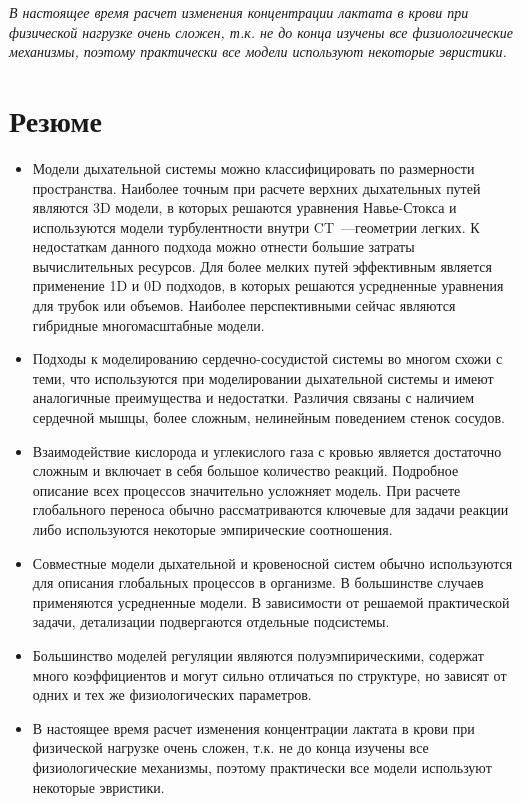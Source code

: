 \textit{В настоящее время расчет изменения концентрации лактата в крови при физической нагрузке очень сложен, т.к. не до конца изучены все физиологические механизмы, поэтому практически все модели используют некоторые эвристики.}

\section{Резюме}
\begin{itemize}
\item
Модели дыхательной системы можно классифицировать по размерности пространства. Наиболее точным при расчете верхних дыхательных путей являются 3D модели, в которых решаются уравнения Навье-Стокса и используются модели турбулентности внутри CT~---геометрии легких. К недостаткам данного подхода можно отнести большие затраты вычислительных ресурсов. Для более мелких путей эффективным является применение 1D и 0D подходов, в которых решаются усредненные уравнения для трубок или объемов. Наиболее перспективными сейчас являются гибридные многомасштабные модели. 
\item
Подходы к моделированию сердечно-сосудистой системы во многом схожи с теми, что используются при моделировании дыхательной системы и имеют аналогичные преимущества и недостатки. Различия связаны с наличием сердечной мышцы, более сложным, нелинейным поведением стенок сосудов.
\item
Взаимодействие кислорода и углекислого газа с кровью является достаточно сложным и включает в себя большое количество реакций. Подробное описание всех процессов значительно усложняет модель. При расчете глобального переноса обычно рассматриваются ключевые для задачи реакции либо используются некоторые эмпирические соотношения.
\item
Совместные модели дыхательной и кровеносной систем обычно используются для описания глобальных процессов в организме. В большинстве случаев применяются усредненные модели. В зависимости от решаемой практической задачи, детализации подвергаются отдельные подсистемы.
\item
Большинство моделей регуляции являются полуэмпирическими, содержат много коэффициентов и могут сильно отличаться по структуре, но зависят от одних и тех же физиологических параметров.
\item
В настоящее время расчет изменения концентрации лактата в крови при физической нагрузке очень сложен, т.к. не до конца изучены все физиологические механизмы, поэтому практически все модели используют некоторые эвристики.

\end{itemize}